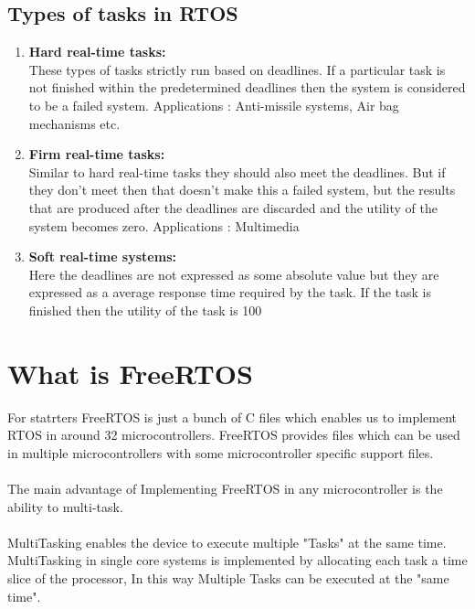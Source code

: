 \documentclass[11pt,a4paper]{article}
\begin{document}
	\subsection{Types of tasks in RTOS}
	\begin{enumerate}
		
		
		\item\textbf{Hard real-time tasks:}\\
		These types of tasks strictly run based on deadlines.
		If a particular task is not finished within the predetermined deadlines  then the system is considered to be a failed system.
		Applications : Anti-missile systems, Air bag mechanisms etc.
		
		\item\textbf{Firm real-time tasks:}\\
		Similar  to hard real-time tasks they should also meet the deadlines.
		But if they don't meet then that doesn't make this a failed system, but the results that are produced after the deadlines are discarded and the utility of the system becomes zero.
		Applications : Multimedia
		
		\item\textbf{Soft real-time systems:}\\
		Here the deadlines are not expressed as some absolute value but they are expressed as a average response time required by the task.
		If the task is finished then the utility of the task is 100%
	\end{enumerate}
\newpage	
	\section{What is FreeRTOS}
	
	For statrters FreeRTOS is just a bunch of C files which enables us to implement RTOS in around 32 microcontrollers. FreeRTOS provides files which can be used in multiple microcontrollers with some microcontroller specific support files.
	\\
	\\   
	The main advantage of Implementing FreeRTOS in any microcontroller is the ability to multi-task.
	\\
	\\
	MultiTasking enables the device to execute multiple "Tasks" at the same time.
	MultiTasking in single core systems is implemented by allocating each task a time slice of the processor, In this way Multiple Tasks can be executed at the "same time".
	\\
	\\
\end{document}
